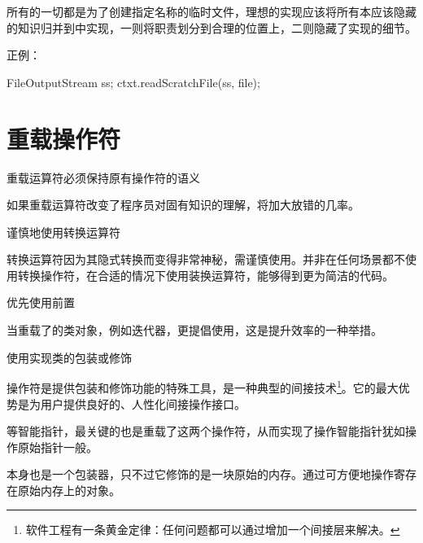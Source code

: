 \begin{content}
所有的一切都是为了创建指定名称的临时文件，理想的实现应该将所有本应该隐藏的知识归并到中实现，一则将职责划分到合理的位置上，二则隐藏了实现的细节。

正例：
\begin{leftbar}
\begin{c++}[caption={应用迪米特法则}]
FileOutputStream ss;
ctxt.readScratchFile(ss, file);
\end{c++}
\end{leftbar}

\end{content}

\section{重载操作符}

\begin{content}

\begin{regulation}
重载运算符必须保持原有操作符的语义
\end{regulation}

如果重载运算符改变了程序员对固有知识的理解，将加大放错的几率。

\begin{regulation}
谨慎地使用转换运算符
\end{regulation}

转换运算符因为其隐式转换而变得非常神秘，需谨慎使用。并非在任何场景都不使用转换操作符，在合适的情况下使用装换运算符，能够得到更为简洁的代码。

\begin{regulation}
优先使用前置
\end{regulation}

当重载了的类对象，例如迭代器，更提倡使用，这是提升效率的一种举措。

\begin{regulation}
使用实现类的包装或修饰
\end{regulation}

操作符是提供包装和修饰功能的特殊工具，是一种典型的间接技术\footnote{软件工程有一条黄金定律：任何问题都可以通过增加一个间接层来解决。}。它的最大优势是为用户提供良好的、人性化间接操作接口。

等智能指针，最关键的也是重载了这两个操作符，从而实现了操作智能指针犹如操作原始指针一般。

本身也是一个包装器，只不过它修饰的是一块原始的内存。通过可方便地操作寄存在原始内存上的对象。


\end{content}
